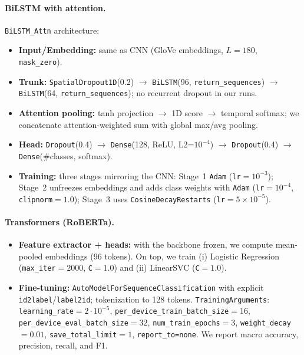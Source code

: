 \documentclass[10pt]{article}
\begin{document}
\paragraph{BiLSTM with attention.}
\texttt{BiLSTM\_Attn} architecture:
\begin{itemize}
  \item \textbf{Input/Embedding:} same as CNN (GloVe embeddings, $L=180$, \texttt{mask\_zero}).
  \item \textbf{Trunk:} \texttt{SpatialDropout1D}(0.2) $\rightarrow$ \texttt{BiLSTM}(96, \texttt{return\_sequences}) $\rightarrow$ \texttt{BiLSTM}(64, \texttt{return\_sequences}); no recurrent dropout in our runs.
  \item \textbf{Attention pooling:} tanh projection $\rightarrow$ 1D score $\rightarrow$ temporal softmax; we concatenate attention-weighted sum with global max/avg pooling.
  \item \textbf{Head:} \texttt{Dropout}(0.4) $\rightarrow$ \texttt{Dense}(128, ReLU, L2=$10^{-4}$) $\rightarrow$ \texttt{Dropout}(0.4) $\rightarrow$ \texttt{Dense}(\#classes, softmax).
  \item \textbf{Training:} three stages mirroring the CNN: Stage~1 \texttt{Adam} (\texttt{lr}$=10^{-3}$); Stage~2 unfreezes embeddings and adds class weights with \texttt{Adam} (\texttt{lr}$=10^{-4}$, \texttt{clipnorm}$=1.0$); Stage~3 uses \texttt{CosineDecayRestarts} (\texttt{lr}$=5\!\times\!10^{-5}$).
\end{itemize}

\paragraph{Transformers (RoBERTa).}
\begin{itemize}
  \item \textbf{Feature extractor + heads:} with the backbone frozen, we compute mean-pooled embeddings (96 tokens). On top, we train (i) Logistic Regression (\texttt{max\_iter}$=2000$, \texttt{C}$=1.0$) and (ii) LinearSVC (\texttt{C}$=1.0$).
  \item \textbf{Fine-tuning:} \texttt{AutoModelForSequenceClassification} with explicit \texttt{id2label}/\texttt{label2id}; tokenization to 128 tokens.
        \texttt{TrainingArguments}: \texttt{learning\_rate}$=2\cdot10^{-5}$, \texttt{per\_device\_train\_batch\_size}$=16$, \texttt{per\_device\_eval\_batch\_size}$=32$, \texttt{num\_train\_epochs}$=3$, \texttt{weight\_decay}$=0.01$, \texttt{save\_total\_limit}$=1$, \texttt{report\_to=none}. We report macro accuracy, precision, recall, and F1.
\end{itemize}
\end{document}
